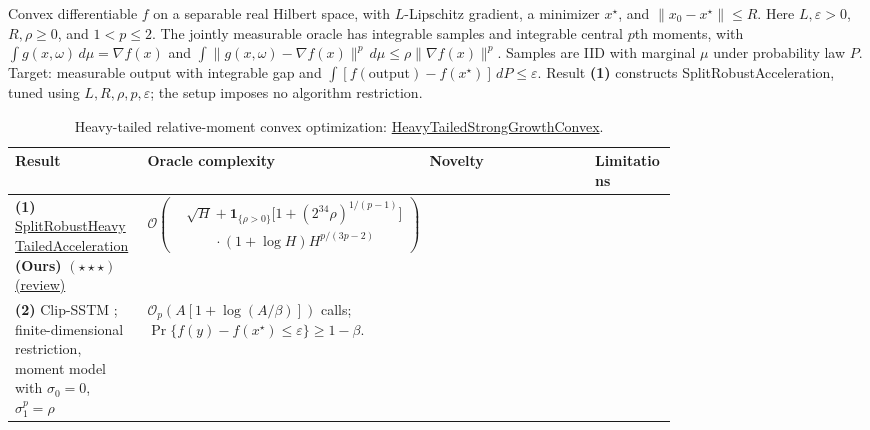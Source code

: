 \begin{table}[tp]
\centering
\caption{Heavy-tailed relative-moment convex optimization: \href{https://github.com/k3nfalt/longtails/blob/main/LongTails/Setups/HeavyTailedStrongGrowthConvex.lean}{HeavyTailedStrongGrowthConvex}.}\label{tab:HeavyTailedStrongGrowthConvex}
\parbox{\linewidth}{\footnotesize Convex differentiable $f$ on a separable real Hilbert space, with $L$-Lipschitz gradient, a minimizer $x^\star$, and $\|x_0-x^\star\|\le R$. Here $L,\varepsilon>0$, $R,\rho\ge0$, and $1<p\le2$. The jointly measurable oracle has integrable samples and integrable central $p$th moments, with $\int g(x,\omega)\,d\mu=\nabla f(x)$ and $\int\|g(x,\omega)-\nabla f(x)\|^p\,d\mu\le\rho\|\nabla f(x)\|^p$. Samples are IID with marginal $\mu$ under probability law $P$. Target: measurable output with integrable gap and $\int[f(\mathrm{output})-f(x^\star)]\,dP\le\varepsilon$. Result \textbf{(1)} constructs SplitRobustAcceleration, tuned using $L,R,\rho,p,\varepsilon$; the setup imposes no algorithm restriction.}\par\smallskip
\begin{threeparttable}
\footnotesize
\setlength{\tabcolsep}{4pt}\renewcommand{\arraystretch}{1.25}
\begin{tabularx}{\linewidth}{@{}>{\raggedright\arraybackslash}p{0.20\linewidth}>{\raggedright\arraybackslash}p{0.32\linewidth}>{\raggedright\arraybackslash}p{0.25\linewidth}>{\raggedright\arraybackslash}X@{}}
\toprule
\textbf{Result} & \textbf{Oracle complexity} & \textbf{Novelty} & \textbf{Limitations} \\
\midrule
\textbf{(1)} \href{https://github.com/k3nfalt/longtails/blob/main/LongTails/Theorems/SplitRobustHeavyTailedAcceleration.lean}{Split\allowbreak Robust\allowbreak Heavy\allowbreak Tailed\allowbreak Acceleration} \textbf{(Ours)} $(\star\star\star)$ \href{https://github.com/k3nfalt/longtails/blob/main/scripts/reviews/SplitRobustHeavyTailedAcceleration.md}{(review)}
& $\mathcal{O}\!\left(\begin{aligned}&\sqrt H+\mathbf{1}_{\{\rho>0\}}\bigl[1+(2^{34}\rho)^{1/(p-1)}\bigr]\\[-2pt]&\qquad\cdot(1+\log H)H^{p/(3p-2)}\end{aligned}\right)$ & & \\
\midrule[1.2pt]
\textbf{(2)} Clip-SSTM \citep[Theorem 5.2]{htsgNekrasova2026v1}; finite-dimensional restriction, moment model with $\sigma_0=0$, $\sigma_1^p=\rho$
& $\mathcal{O}_{p}\!\left(A[1+\log(A/\beta)]\right)$ calls; $\Pr\{f(y)-f(x^\star)\le\varepsilon\}\ge1-\beta$.

\end{tabularx}
\end{threeparttable}
\end{table}
